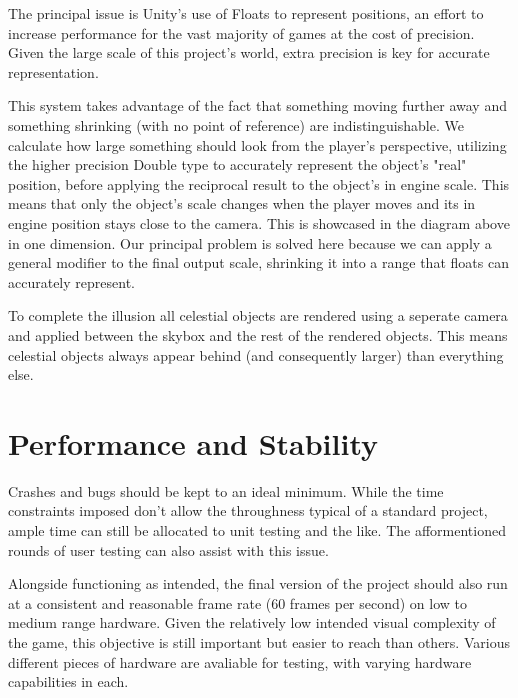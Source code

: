 \documentclass{report}
\begin{document}
The principal issue is Unity's use of Floats to represent positions, an effort to increase performance for the vast majority of games at the cost of precision. Given the large scale of this project's world, extra precision is key for accurate representation. 

This system takes advantage of the fact that something moving further away and something shrinking (with no point of reference) are indistinguishable. We calculate how large something should look from the player's perspective, utilizing the higher precision Double type to accurately represent the object's "real" position, before applying the reciprocal result to the object's in engine scale. This means that only the object's scale changes when the player moves and its in engine position stays close to the camera. This is showcased in the diagram above in one dimension. Our principal problem is solved here because we can apply a general modifier to the final output scale, shrinking it into a range that floats can accurately represent.

 To complete the illusion all celestial objects are rendered using a seperate camera and applied between the skybox and the rest of the rendered objects. This means celestial objects always appear behind (and consequently larger) than everything else.

\section{Performance and Stability}

Crashes and bugs should be kept to an ideal minimum. While the time constraints imposed don't allow the throughness typical of a standard project, ample time can still be allocated to unit testing and the like. The afformentioned rounds of user testing can also assist with this issue.

Alongside functioning as intended, the final version of the project should also run at a consistent and reasonable frame rate (60 frames per second) on low to medium range hardware. Given the relatively low intended visual complexity of the game, this objective is still important but easier to reach than others. Various different pieces of hardware are avaliable for testing, with varying hardware capabilities in each.
\end{document}
